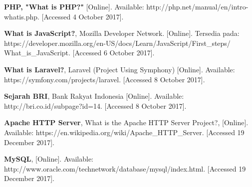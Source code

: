 \begin{thebibliography}{9}
	
	\textbf{PHP, "What is PHP?"} [Online]. Available: http://php.net/manual/en/intro-whatis.php. [Accessed 4 October 2017].		
	
	\textbf{What is JavaScript?}, Mozilla Developer Network. [Online]. Tersedia pada: https://developer.mozilla.org/en-US/docs/Learn/JavaScript/First\_steps/
	What\_is\_JavaScript. [Accessed 6 October 2017].
	
	\textbf{What is Laravel?}, Laravel (Project Using Symphony) [Online]. Available: https://symfony.com/projects/laravel. [Accessed 8 October 2017].
	
	\textbf {Sejarah BRI}, Bank Rakyat Indonesia [Online]. Available: http://bri.co.id/subpage?id=14. [Accessed 8 October 2017].
	
	\textbf {Apache HTTP Server}, What is the Apache HTTP Server Project?, [Online]. Available: https://en.wikipedia.org/wiki/Apache\_HTTP\_Server. [Accessed 19 December 2017].
	
	\textbf{MySQL}, [Online]. Available: http://www.oracle.com/technetwork/database/mysql/index.html. [Accessed 19 December 2017].
\end{thebibliography}
